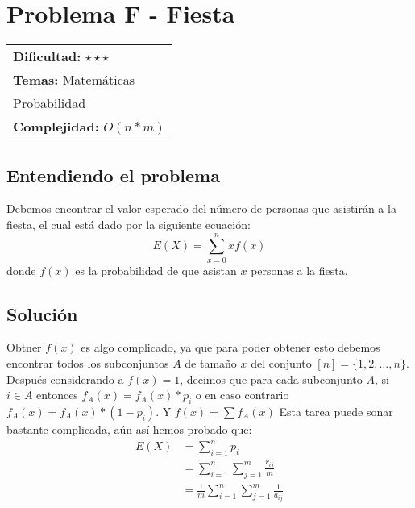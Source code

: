 \section{Problema F - Fiesta}

\hfill
\begin{tabular}{@{}l@{}}
\textbf{Dificultad:} $\star\star\star$ \\
\textbf{Temas:} Matemáticas \\
Probabilidad \\
\textbf{Complejidad:} $O(n*m)$
\end{tabular}

\subsection*{Entendiendo el problema}
Debemos encontrar el valor esperado del número de personas que asistirán a la fiesta, el cual está dado por la siguiente ecuación:
$$E(X)= \sum_{x=0}^n x f(x)$$
donde $f(x)$ es la probabilidad de que asistan $x$ personas a la fiesta. 
\subsection*{Solución}
Obtner $f(x)$ es algo complicado, ya que para poder obtener esto debemos encontrar todos los subconjuntos $A$ de tamaño $x$ del conjunto $[n]=\{1, 2,\dots, n\}$. Después considerando a $f(x)=1$, decimos que para cada subconjunto $A$, si $i \in A$ entonces $f_A(x)=f_A(x)*p_i$ o en caso contrario $f_A(x)=f_A(x)*(1-p_i)$. Y $f(x)=\sum f_A(x)$
Esta tarea puede sonar bastante complicada, aún así hemos probado que:
\begin{align*} 
E(X) &=  \sum_{i=1}^n p_i \\ 
 &=  \sum_{i=1}^n \sum_{j=1}^m \frac{r_{ij}}{m}\\
 &=\frac{1}{m} \sum_{i=1}^n \sum_{j=1}^m \frac{1}{a_{ij}}
\end{align*}

